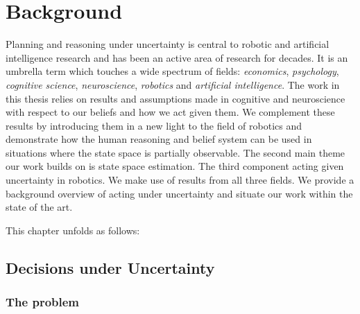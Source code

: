 \chapter{Background}

Planning and reasoning under uncertainty is central to robotic and artificial intelligence research and has 
been an active area of research for decades. It is an umbrella term which touches a
wide spectrum of fields: \textit{economics}, \textit{psychology}, \textit{cognitive science}, \textit{neuroscience},
\textit{robotics} and \textit{artificial intelligence}. The work in this thesis relies on results  and assumptions 
made in cognitive and neuroscience with respect to our beliefs and how we act given them. We complement 
these results by introducing them in a new light to the field of robotics and demonstrate how the human reasoning and belief system 
can be used in situations where the state space is partially observable. The second main theme our work builds on is 
state space estimation. The third component acting given uncertainty in robotics. We make use of results from all 
three fields. We provide a background overview of acting under uncertainty and situate our work within the state of the 
art.

This chapter unfolds as follows: 



\section{Decisions under Uncertainty}

\subsection{The problem}

